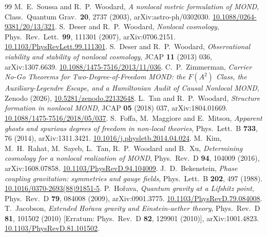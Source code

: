 \documentclass[11pt,letterpaper]{article}
\begin{document}
\begin{thebibliography}{99}
 M.\ E.\ Soussa and R.\ P.\ Woodard, \emph{A nonlocal metric formulation of MOND}, Class.\ Quantum Grav.\ \textbf{20}, 2737 (2003), arXiv:astro-ph/0302030. \href{https://doi.org/10.1088/0264-9381/20/13/321}{10.1088/0264-9381/20/13/321}.
 S.\ Deser and R.\ P.\ Woodard, \emph{Nonlocal cosmology}, Phys.\ Rev.\ Lett.\ \textbf{99}, 111301 (2007), arXiv:0706.2151. \href{https://doi.org/10.1103/PhysRevLett.99.111301}{10.1103/PhysRevLett.99.111301}.
 S.\ Deser and R.\ P.\ Woodard, \emph{Observational viability and stability of nonlocal cosmology}, JCAP \textbf{11} (2013) 036, arXiv:1307.6639. \href{https://doi.org/10.1088/1475-7516/2013/11/036}{10.1088/1475-7516/2013/11/036}.
 C.\ P.\ Zimmerman, \emph{Carrier No-Go Theorems for Two-Degree-of-Freedom MOND: the $F(A^2)$ Class, the Auxiliary-Legendre Escape, and a Hamiltonian Audit of Causal Nonlocal MOND}, Zenodo (2026), \href{https://doi.org/10.5281/zenodo.22132648}{10.5281/zenodo.22132648}.
 L.\ Tan and R.\ P.\ Woodard, \emph{Structure formation in nonlocal MOND}, JCAP \textbf{05} (2018) 037, arXiv:1804.01669. \href{https://doi.org/10.1088/1475-7516/2018/05/037}{10.1088/1475-7516/2018/05/037}.
 S.\ Foffa, M.\ Maggiore and E.\ Mitsou, \emph{Apparent ghosts and spurious degrees of freedom in non-local theories}, Phys.\ Lett.\ B \textbf{733}, 76 (2014), arXiv:1311.3421. \href{https://doi.org/10.1016/j.physletb.2014.04.024}{10.1016/j.physletb.2014.04.024}.
 M.\ Kim, M.\ H.\ Rahat, M.\ Sayeb, L.\ Tan, R.\ P.\ Woodard and B.\ Xu, \emph{Determining cosmology for a nonlocal realization of MOND}, Phys.\ Rev.\ D \textbf{94}, 104009 (2016), arXiv:1608.07858. \href{https://doi.org/10.1103/PhysRevD.94.104009}{10.1103/PhysRevD.94.104009}.
 J.\ D.\ Bekenstein, \emph{Phase coupling gravitation: symmetries and gauge fields}, Phys.\ Lett.\ B \textbf{202}, 497 (1988). \href{https://doi.org/10.1016/0370-2693(88)91851-5}{10.1016/0370-2693(88)91851-5}.
 P.\ Ho\v{r}ava, \emph{Quantum gravity at a Lifshitz point}, Phys.\ Rev.\ D \textbf{79}, 084008 (2009), arXiv:0901.3775. \href{https://doi.org/10.1103/PhysRevD.79.084008}{10.1103/PhysRevD.79.084008}.
 T.\ Jacobson, \emph{Extended Ho\v{r}ava gravity and Einstein-aether theory}, Phys.\ Rev.\ D \textbf{81}, 101502 (2010) [Erratum: Phys.\ Rev.\ D \textbf{82}, 129901 (2010)], arXiv:1001.4823. \href{https://doi.org/10.1103/PhysRevD.81.101502}{10.1103/PhysRevD.81.101502}.

\end{thebibliography}
\end{document}
